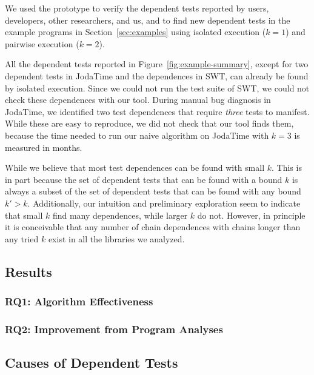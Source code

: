 
We used the prototype to verify the dependent tests reported by
users, developers, other researchers, and us, and to find new dependent
tests in the
example programs in Section~\ref{sec:examples} using isolated execution ($k = 1$)
and pairwise execution ($k = 2$).

All the dependent tests reported in Figure~\ref{fig:example-summary},
except for two dependent tests in JodaTime and the dependences in SWT, 
can already be found by isolated execution. Since we could not run the
test suite of SWT, we could not check these dependences with our tool.
During manual bug diagnosis in JodaTime, we identified two test dependences that require
\emph{three} tests to manifest. While these are easy to reproduce, we
did not check that our tool finds them, because the time needed to
run our naive algorithm on JodaTime with $k=3$ is measured in months.

While we believe that most test dependences can be found with small
$k$. This is in part because the set of dependent tests that can be
found with a bound $k$ is always a subset of the set of dependent
tests that can be found with any bound $k' > k$. Additionally, our
intuition and preliminary exploration seem to indicate that small $k$
find many dependences, while larger $k$ do not. However, in principle
it is conceivable
that any number of chain dependences with chains longer than any tried $k$ exist
in all the libraries we analyzed.

\subsection{Results}


\subsubsection{RQ1: Algorithm Effectiveness}

\subsubsection{RQ2: Improvement from Program Analyses}

\subsection{Causes of Dependent Tests}

